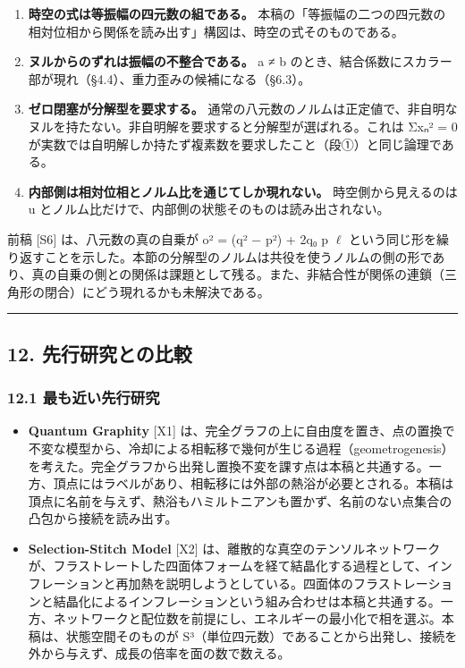 \documentclass[
  a4paper,
]{ltjsarticle}
\providecommand{\tightlist}{%
  \setlength{\itemsep}{0pt}\setlength{\parskip}{0pt}}
\begin{document}
\begin{enumerate}
\def\labelenumi{\arabic{enumi}.}
\tightlist
\item
  \textbf{時空の式は等振幅の四元数の組である。}
  本稿の「等振幅の二つの四元数の相対位相から関係を読み出す」構図は、時空の式そのものである。
\item
  \textbf{ヌルからのずれは振幅の不整合である。} \textbar a\textbar{} ≠
  \textbar b\textbar{}
  のとき、結合係数にスカラー部が現れ（§4.4）、重力歪みの候補になる（§6.3）。
\item
  \textbf{ゼロ閉塞が分解型を要求する。}
  通常の八元数のノルムは正定値で、非自明なヌルを持たない。非自明解を要求すると分解型が選ばれる。これは
  Σxₙ² = 0
  が実数では自明解しか持たず複素数を要求したこと（段①）と同じ論理である。
\item
  \textbf{内部側は相対位相とノルム比を通じてしか現れない。}
  時空側から見えるのは u
  とノルム比だけで、内部側の状態そのものは読み出されない。
\end{enumerate}

前稿 {[}S6{]} は、八元数の真の自乗が o² = (q² − \textbar p\textbar²) +
2q₀ p \(\ell\)
という同じ形を繰り返すことを示した。本節の分解型のノルムは共役を使うノルムの側の形であり、真の自乗の側との関係は課題として残る。また、非結合性が関係の連鎖（三角形の閉合）にどう現れるかも未解決である。

\begin{center}\rule{0.5\linewidth}{0.5pt}\end{center}

\subsection{12.
先行研究との比較}\label{ux5148ux884cux7814ux7a76ux3068ux306eux6bd4ux8f03}

\subsubsection{12.1
最も近い先行研究}\label{ux6700ux3082ux8fd1ux3044ux5148ux884cux7814ux7a76}

\begin{itemize}
\tightlist
\item
  \textbf{Quantum Graphity} {[}X1{]}
  は、完全グラフの上に自由度を置き、点の置換で不変な模型から、冷却による相転移で幾何が生じる過程（geometrogenesis）を考えた。完全グラフから出発し置換不変を課す点は本稿と共通する。一方、頂点にはラベルがあり、相転移には外部の熱浴が必要とされる。本稿は頂点に名前を与えず、熱浴もハミルトニアンも置かず、名前のない点集合の凸包から接続を読み出す。
\item
  \textbf{Selection-Stitch Model} {[}X2{]}
  は、離散的な真空のテンソルネットワークが、フラストレートした四面体フォームを経て結晶化する過程として、インフレーションと再加熱を説明しようとしている。四面体のフラストレーションと結晶化によるインフレーションという組み合わせは本稿と共通する。一方、ネットワークと配位数を前提にし、エネルギーの最小化で相を選ぶ。本稿は、状態空間そのものが
  S³（単位四元数）であることから出発し、接続を外から与えず、成長の倍率を面の数で数える。
\end{itemize}
\end{document}

